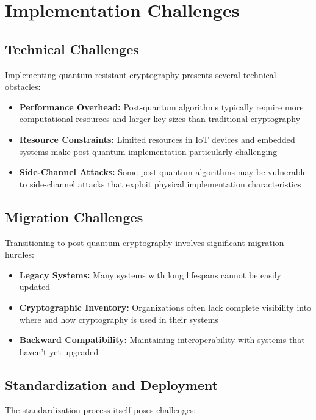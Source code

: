 \chapter{Implementation Challenges}

\section{Technical Challenges}
Implementing quantum-resistant cryptography presents several technical obstacles:

\begin{itemize}
    \item \textbf{Performance Overhead:} Post-quantum algorithms typically require more computational resources and larger key sizes than traditional cryptography
    
    \item \textbf{Resource Constraints:} Limited resources in IoT devices and embedded systems make post-quantum implementation particularly challenging
    
    \item \textbf{Side-Channel Attacks:} Some post-quantum algorithms may be vulnerable to side-channel attacks that exploit physical implementation characteristics
\end{itemize}

\section{Migration Challenges}
Transitioning to post-quantum cryptography involves significant migration hurdles:

\begin{itemize}
    \item \textbf{Legacy Systems:} Many systems with long lifespans cannot be easily updated
    
    \item \textbf{Cryptographic Inventory:} Organizations often lack complete visibility into where and how cryptography is used in their systems
    
    \item \textbf{Backward Compatibility:} Maintaining interoperability with systems that haven't yet upgraded
\end{itemize}

\section{Standardization and Deployment}
The standardization process itself poses challenges:

